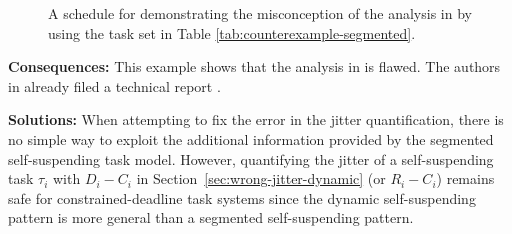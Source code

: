 \begin{figure}[t]
{}       
\caption{A schedule for demonstrating the misconception of the analysis in \cite{RTCSA-BletsasA05} by using the task set in Table  \ref{tab:counterexample-segmented}. }
\label{fig:counterexample-segmented}
\end{figure}


{\bf Consequences:} This example shows that the analysis in \cite{RTCSA-BletsasA05} is flawed.  The authors in \cite{RTCSA-BletsasA05}  already filed a technical report \cite{BletsasReport2015}.

{\bf Solutions:} When attempting to fix the error in the jitter quantification, there is no simple way to exploit the additional 
information provided by the segmented self-suspending task model.
However, quantifying the jitter of a self-suspending task $\tau_i$ with $D_i-C_i$ in Section~\ref{sec:wrong-jitter-dynamic} (or $R_i-C_i$) remains safe for constrained-deadline task systems since the dynamic self-suspending pattern is more general than a segmented self-suspending pattern.

\label{sec:wrong-critical}

